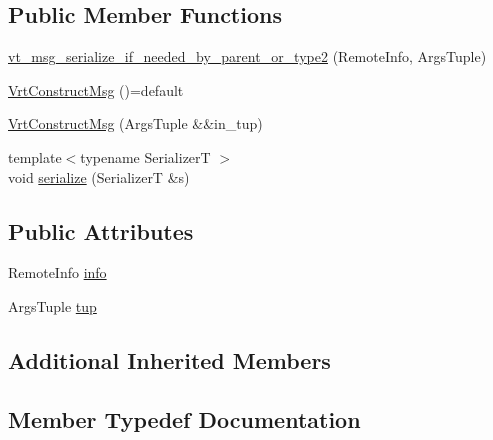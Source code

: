 \subsection*{Public Member Functions}
\begin{DoxyCompactItemize}
\item 
\hyperlink{structvt_1_1vrt_1_1_vrt_construct_msg_a3a0360b0a8ab7d4ee5f2ad92055ea001}{vt\+\_\+msg\+\_\+serialize\+\_\+if\+\_\+needed\+\_\+by\+\_\+parent\+\_\+or\+\_\+type2} (Remote\+Info, Args\+Tuple)
\item 
\hyperlink{structvt_1_1vrt_1_1_vrt_construct_msg_a5beda0ba3e8ea8c303cf95040c567862}{Vrt\+Construct\+Msg} ()=default
\item 
\hyperlink{structvt_1_1vrt_1_1_vrt_construct_msg_a30036d2df53914ad5d1b4e354d723040}{Vrt\+Construct\+Msg} (Args\+Tuple \&\&in\+\_\+tup)
\item 
{\footnotesize template$<$typename SerializerT $>$ }\\void \hyperlink{structvt_1_1vrt_1_1_vrt_construct_msg_af6ed1200b682487df4fc1d2faf86aa02}{serialize} (SerializerT \&s)
\end{DoxyCompactItemize}
\subsection*{Public Attributes}
\begin{DoxyCompactItemize}
\item 
Remote\+Info \hyperlink{structvt_1_1vrt_1_1_vrt_construct_msg_a570a118633d088ea4b0cae7e0edfb716}{info}
\item 
Args\+Tuple \hyperlink{structvt_1_1vrt_1_1_vrt_construct_msg_a5d74ba39e846fba16e6cc83c33c21fe2}{tup}
\end{DoxyCompactItemize}
\subsection*{Additional Inherited Members}


\subsection{Member Typedef Documentation}
\mbox{\label{structvt_1_1vrt_1_1_vrt_construct_msg_a5ec9caa553a3004bce6a6ee151d15900}} 
